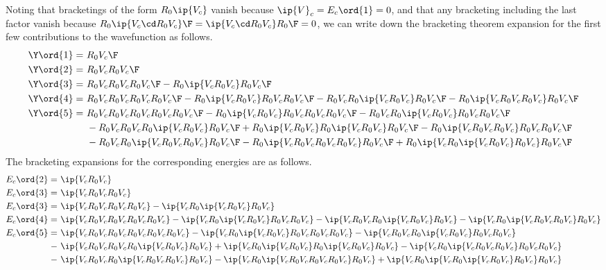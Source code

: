 \documentclass[11pt,fleqn]{article}
\numberwithin{equation}{section}
\begin{document}
\begin{ex}
Noting that bracketings of the form $R_0\ip{V_c}$ vanish because $\ip{V}_c=E_c\ord{1}=0$, and that any bracketing including the last factor vanish because $R_0\ip{V_c\cd R_0V_c}\F=\ip{V_c\cd R_0V_c}R_0\F=0$, we can write down the bracketing theorem expansion for the first few contributions to the wavefunction as follows.
\begin{align*}
  \Y\ord{1}
=&\
  R_0V_c\F
\\
  \Y\ord{2}
=&\
  R_0V_cR_0V_c\F
\\
  \Y\ord{3}
=&\
  R_0V_cR_0V_cR_0V_c\F
-
  R_0\ip{V_cR_0V_c}R_0V_c\F
\\
  \Y\ord{4}
=&\
  R_0V_cR_0V_cR_0V_cR_0V_c\F
-
  R_0\ip{V_cR_0V_c}R_0V_cR_0V_c\F
-
  R_0V_cR_0\ip{V_cR_0V_c}R_0V_c\F
-
  R_0\ip{V_cR_0V_cR_0V_c}R_0V_c\F
\\
  \Y\ord{5}
=&\
  R_0V_cR_0V_cR_0V_cR_0V_cR_0V_c\F
-
  R_0\ip{V_cR_0V_c}R_0V_cR_0V_cR_0V_c\F
-
  R_0V_cR_0\ip{V_cR_0V_c}R_0V_cR_0V_c\F
\\&\
-
  R_0V_cR_0V_cR_0\ip{V_cR_0V_c}R_0V_c\F
+
  R_0\ip{V_cR_0V_c}R_0\ip{V_cR_0V_c}R_0V_c\F
-
  R_0\ip{V_cR_0V_cR_0V_c}R_0V_cR_0V_c\F
\\&\
-
  R_0V_cR_0\ip{V_cR_0V_cR_0V_c}R_0V_c\F
-
  R_0\ip{V_cR_0V_cR_0V_cR_0V_c}R_0V_c\F
+
  R_0\ip{V_cR_0\ip{V_cR_0V_c}R_0V_c}R_0V_c\F
\end{align*}
The bracketing expansions for the corresponding energies are as follows.
\begin{align*}
  E_c\ord{2}
=&\
  \ip{V_cR_0V_c}
\\
  E_c\ord{3}
=&\
  \ip{V_cR_0V_cR_0V_c}
\\
  E_c\ord{3}
=&\
  \ip{V_cR_0V_cR_0V_cR_0V_c}
-
  \ip{V_cR_0\ip{V_cR_0V_c}R_0V_c}
\\
  E_c\ord{4}
=&\
  \ip{V_cR_0V_cR_0V_cR_0V_cR_0V_c}
-
  \ip{V_cR_0\ip{V_cR_0V_c}R_0V_cR_0V_c}
-
  \ip{V_cR_0V_cR_0\ip{V_cR_0V_c}R_0V_c}
-
  \ip{V_cR_0\ip{V_cR_0V_cR_0V_c}R_0V_c}
\\
  E_c\ord{5}
=&\
  \ip{V_cR_0V_cR_0V_cR_0V_cR_0V_cR_0V_c}
-
  \ip{V_cR_0\ip{V_cR_0V_c}R_0V_cR_0V_cR_0V_c}
-
  \ip{V_cR_0V_cR_0\ip{V_cR_0V_c}R_0V_cR_0V_c}
\\-&\
  \ip{V_cR_0V_cR_0V_cR_0\ip{V_cR_0V_c}R_0V_c}
+
  \ip{V_cR_0\ip{V_cR_0V_c}R_0\ip{V_cR_0V_c}R_0V_c}
-
  \ip{V_cR_0\ip{V_cR_0V_cR_0V_c}R_0V_cR_0V_c}
\\-&\
  \ip{V_cR_0V_cR_0\ip{V_cR_0V_cR_0V_c}R_0V_c}
-
  \ip{V_cR_0\ip{V_cR_0V_cR_0V_cR_0V_c}R_0V_c}
+
  \ip{V_cR_0\ip{V_cR_0\ip{V_cR_0V_c}R_0V_c}R_0V_c}
\end{align*}
\end{ex}
\end{document}
